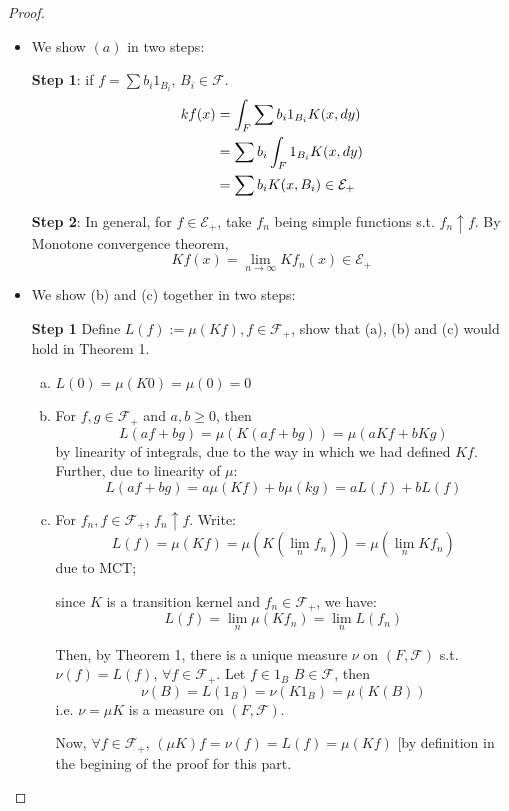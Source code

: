 \documentclass[11pt]{article}
\newcommand{\m}{\mathcal}
\begin{document}
        \begin{proof}

          \begin{itemize}
            \item 
              We show $(a)$ in two steps: 

              \textbf{Step 1}: if $f = \sum b_i 1 _{B_i}$, $B_i \in \m F$. 
              \[\aligned
                k f(x) & = \int _ F \sum b_i 1 _{B_i} K(x, dy) \\
                & = \sum b_i \int _F 1_{B_i} K(x, dy) \\
                & = \sum b_i K(x, B_i) \in \m E_+
              \endaligned
            \]

            \textbf{Step 2}: In  general, for $f \in \m E_+$, take $f_n$ being simple
            functions s.t. $f_n \uparrow f$. By Monotone convergence theorem, 
            \[
              Kf(x) = \lim_{n \to \infty}  K f_n(x) \in \m E_+
            \]

          \item We show (b) and (c) together in two steps: 

            \textbf{Step 1} Define $L(f) := \mu (Kf), f \in \m F_+$, show that
            (a), (b) and (c) would hold in Theorem 1.
            \begin{enumerate}[(a)]
              \item $L(0) = \mu (K 0) = \mu (0) = 0$
              \item For $f,g \in \m F_+$ and $a,b \ge 0$, then 
                \[
                  L(af + bg ) = \mu (K(af + bg)) = \mu(aKf + b Kg) 
                \]
                by linearity of integrals, due to the way in which we had
                defined $Kf$. Further, due to linearity of $\mu$: 
                \[
                  L(af + bg) = a \mu (Kf) + b\mu (kg) = a L (f) + b  L (f) 
                \]

              \item For $f_n, f \in \m F_+$, $f_n \uparrow f$. Write: 
                \[
                  L(f) = \mu (Kf)= \mu(K(\lim_n f_n) ) = \mu(\lim _n K f_n)
                \]
                due to MCT;

                since $K$ is a transition kernel and $f_n \in \m F_+$, we have: 
                \[
                  L(f) = \lim _n \mu(Kf_n) = \lim_n L(f_n)
                \]

                Then, by Theorem 1, there is a unique measure $\nu $ on $(F, \m
                F)$ s.t. $\nu (f) = L(f)$, $\forall f \in \m F_+$. Let $f \in
                1_B$ $B \in \m F$, then 
                \[
                  \nu (B) = L(1_B)  = \nu (K 1_B) = \mu (K(B))
                \]
                i.e. $\nu = \mu K$ is a measure on $(F, \m F)$. 

                Now, $\forall f \in \m F_+$, $(\mu K) f = \nu (f) = L(f) =
                \mu(Kf)$ [by definition in the begining of the proof for this
                part.

            \end{enumerate}
        \end{itemize}

    \end{proof}
\end{document}
